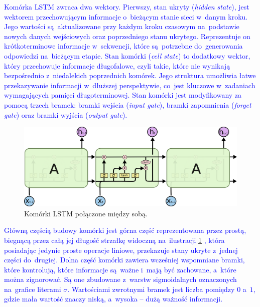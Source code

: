 \documentclass[data-science]{agh-wi} %
\begin{document}
\textcolor{blue}{Komórka LSTM zwraca dwa wektory. Pierwszy, stan ukryty (\textit{hidden state}), jest wektorem przechowującym informacje o~bieżącym stanie sieci w~danym kroku. Jego wartości są~aktualizowane przy każdym kroku czasowym na~podstawie nowych danych wejściowych oraz poprzedniego stanu ukrytego. Reprezentuje on krótkoterminowe informacje w~sekwencji, które są~potrzebne do~generowania odpowiedzi na~bieżącym etapie. Stan komórki (\textit{cell state}) to dodatkowy wektor, który przechowuje informacje długofalowe, czyli takie, które nie wynikają bezpośrednio z~niedalekich poprzednich komórek. Jego struktura umożliwia łatwe przekazywanie informacji w~dłuższej perspektywie, co~jest kluczowe w~zadaniach wymagających pamięci długoterminowej. Stan komórki jest modyfikowany za pomocą trzech bramek: bramki wejścia (\textit{input gate}), bramki zapomnienia (\textit{forget gate}) oraz bramki wyjścia (\textit{output gate}).}

\begin{figure}[ht!]
    \begin{center}
        \includegraphics[width=0.6\linewidth]{./img/LSTM3-chain.png}
    \end{center}
    \caption{Komórki LSTM połączone między sobą.}\label{fig:lstm_chain}
\end{figure}

\textcolor{blue}{Główną częścią budowy komórki jest górna część reprezentowana przez prostą, biegnącą przez całą jej długość strzałkę widoczną na~ilustracji \ref*{fig:lstm_chain} \cite{Understanding_lstm}, która posiadając jedynie proste operacje liniowe, przekazuje stany ukryte z~jednej części do~drugiej. Dolna część komórki zawiera wcześniej wspomniane bramki, które kontrolują, które informacje są~ważne i~mają być zachowane, a~które można zignorować. Są one zbudowane z~warstw sigmoidalnych oznaczonych na~grafice literami $\sigma$. Wartościami zwrotnymi \textcolor{blue}{bramek} jest liczba pomiędzy $0$ a~$1$, gdzie mała wartość znaczy niską, a~wysoka -- dużą ważność informacji.} 
\end{document}
